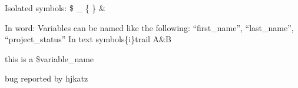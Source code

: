 \documentclass{article}
\begin{document}
Isolated symbols: \$  \_ \{ \} \&

In word: Variables can be named like the following: ``first\_name'', ``last\_name'', ``project{\_}status''
In text symbols\{i\}trail A\&B

this is a \$variable\_name

bug reported by hjkatz
\end{document}
